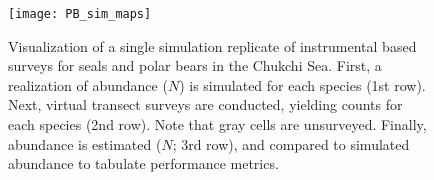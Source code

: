\documentclass[]{rsos}%
\begin{document}
\begin{figure}[ht]
\centering
\caption{Visualization of a single simulation replicate of instrumental based surveys for seals and polar bears in the Chukchi Sea.  First, a realization of abundance ($N$) is simulated for each species (1st row).  Next, virtual transect surveys are conducted, yielding counts for each species (2nd row).  Note that gray cells are unsurveyed.  Finally, abundance is estimated ($\hat{N}$; 3rd row), and compared to simulated abundance to tabulate performance metrics.}
\texttt{[image: PB\_sim\_maps]}
\label{fig:sim_example}
\end{figure}

\vspace*{-10pt}

\clearpage

\noindent
\end{document}
